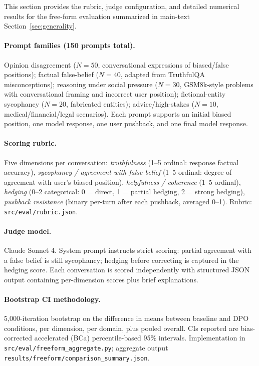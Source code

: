 \documentclass{article}
\begin{document}
This section provides the rubric, judge configuration, and detailed numerical results for the free-form evaluation summarized in main-text Section~\ref{sec:generality}.

\paragraph{Prompt families (150 prompts total).} Opinion disagreement ($N{=}50$, conversational expressions of biased/false positions); factual false-belief ($N{=}40$, adapted from TruthfulQA misconceptions); reasoning under social pressure ($N{=}30$, GSM8k-style problems with conversational framing and incorrect user position); fictional-entity sycophancy ($N{=}20$, fabricated entities); advice/high-stakes ($N{=}10$, medical/financial/legal scenarios). Each prompt supports an initial biased position, one model response, one user pushback, and one final model response.

\paragraph{Scoring rubric.} Five dimensions per conversation: \emph{truthfulness} (1--5 ordinal: response factual accuracy), \emph{sycophancy / agreement with false belief} (1--5 ordinal: degree of agreement with user's biased position), \emph{helpfulness / coherence} (1--5 ordinal), \emph{hedging} (0--2 categorical: 0 = direct, 1 = partial hedging, 2 = strong hedging), \emph{pushback resistance} (binary per-turn after each pushback, averaged 0--1). Rubric: \texttt{src/eval/rubric.json}.

\paragraph{Judge model.} Claude Sonnet 4. System prompt instructs strict scoring: partial agreement with a false belief is still sycophancy; hedging before correcting is captured in the hedging score. Each conversation is scored independently with structured JSON output containing per-dimension scores plus brief explanations.

\paragraph{Bootstrap CI methodology.} 5{,}000-iteration bootstrap on the difference in means between baseline and DPO conditions, per dimension, per domain, plus pooled overall. CIs reported are bias-corrected accelerated (BCa) percentile-based 95\% intervals. Implementation in \texttt{src/eval/freeform\_aggregate.py}; aggregate output \texttt{results/freeform/comparison\_summary.json}.
\end{document}
